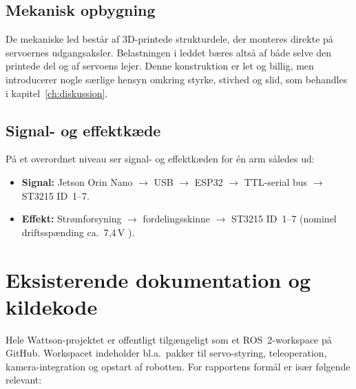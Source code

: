 \subsection{Mekanisk opbygning}

De mekaniske led består af 3D-printede strukturdele, der monteres direkte
på servoernes udgangsaksler. Belastningen i leddet bæres altså af både
selve den printede del og af servoens lejer. Denne konstruktion er let og
billig, men introducerer nogle særlige hensyn omkring styrke, stivhed og
slid, som behandles i kapitel~\ref{ch:diskussion}.

\subsection{Signal- og effektkæde}

På et overordnet niveau ser signal- og effektkæden for én arm således ud:

\begin{itemize}
    \item \textbf{Signal:} Jetson Orin Nano $\rightarrow$ USB $\rightarrow$
          ESP32 $\rightarrow$ TTL-serial bus $\rightarrow$ ST3215 ID~1--7.
    \item \textbf{Effekt:} Strømforsyning $\rightarrow$ fordelingsskinne
          $\rightarrow$ ST3215 ID~1--7 (nominel driftsspænding ca.\ 7,4\,V
          ).
\end{itemize}

\clearpage
\section{Eksisterende dokumentation og kildekode}
\label{sec:doks-kode}

Hele Wattson-projektet er offentligt tilgængeligt som et ROS~2-workspace
på GitHub. Workspacet indeholder bl.a.\ pakker til servo-styring,
teleoperation, kamera-integration og opstart af robotten. For rapportens
formål er især følgende relevant:

